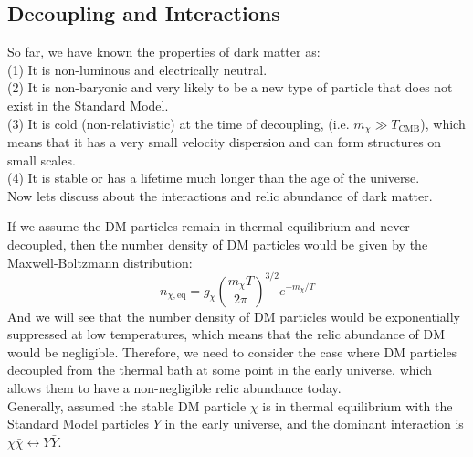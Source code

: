 \clearpage
\subsection{Decoupling and Interactions}
\begin{intuition}
    So far, we have known the properties of dark matter as: \\
    (1) It is non-luminous and electrically neutral. \\
    (2) It is non-baryonic and very likely to be a new type of particle that does not exist in the Standard Model. \\
    (3) It is cold (non-relativistic) at the time of decoupling, (i.e. $m_\chi \gg T_{\mathrm{CMB}}$), which means that it has a very small velocity dispersion and can form structures on small scales. \\
    (4) It is stable or has a lifetime much longer than the age of the universe. \\

    Now lets discuss about the interactions and relic abundance of dark matter. 
\end{intuition}

\bigskip \noindent
\begin{intuition}
    If we assume the DM particles remain in thermal equilibrium and never decoupled, then the number density of DM particles would be given by the Maxwell-Boltzmann distribution:
    \[
        n_{\chi,\mathrm{eq}} = g_\chi \left( \frac{m_\chi T}{2\pi} \right)^{3/2} e^{-m_\chi/T}
    \]
    And we will see that the number density of DM particles would be exponentially suppressed at low temperatures, which means that the relic abundance of DM would be negligible. Therefore, we need to consider the case where DM particles decoupled from the thermal bath at some point in the early universe, which allows them to have a non-negligible relic abundance today. \\

    Generally, assumed the stable DM particle $\chi$ is in thermal equilibrium with the Standard Model particles $Y$ in the early universe, and the dominant interaction is $\chi \bar{\chi} \leftrightarrow Y \bar{Y}$. \\
\end{intuition}

